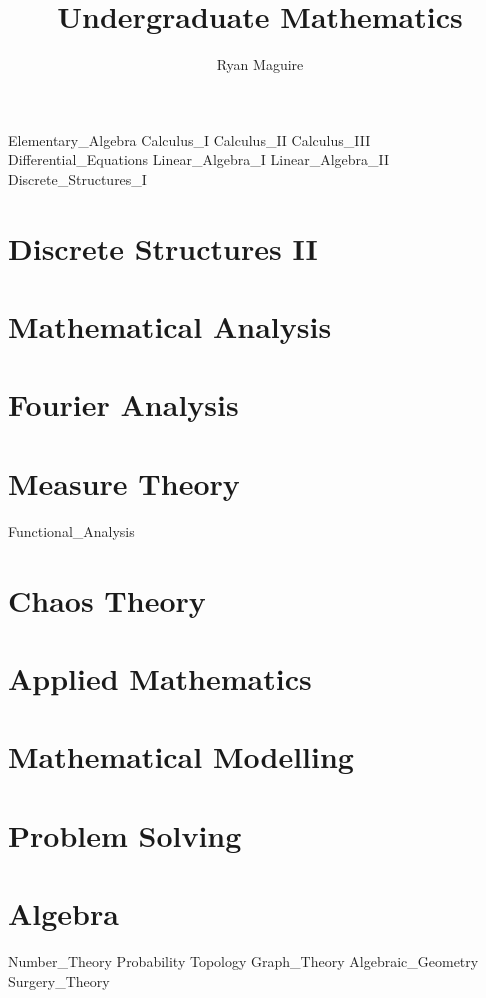 \documentclass[crop=false,class=book,oneside]{standalone}
\begin{document}
    \newif\ifmathcourses
    \ifx\ifcourses\undefined
        \title{Undergraduate Mathematics}
        \author{Ryan Maguire}
        \date{\vspace{-5ex}}
        \maketitle
        \tableofcontents
        \listoffigures
        \listoftables
        \clearpage
    \fi
    {Elementary_Algebra}
    {Calculus_I}
    {Calculus_II}
    {Calculus_III}
    {Differential_Equations}
    {Linear_Algebra_I}
    {Linear_Algebra_II}
    {Discrete_Structures_I}
    \chapter{Discrete Structures II}
    \chapter{Mathematical Analysis}
    \chapter{Fourier Analysis}
    \chapter{Measure Theory}
    {Functional_Analysis}
    \chapter{Chaos Theory}
    \chapter{Applied Mathematics}
    \chapter{Mathematical Modelling}
    \chapter{Problem Solving}
    \chapter{Algebra}
    {Number_Theory}
    {Probability}
    {Topology}
    {Graph_Theory}
    {Algebraic_Geometry}
    {Surgery_Theory}
\end{document}
